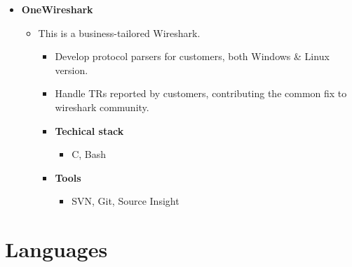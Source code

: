 \documentclass[11pt,a4paper,sans]{moderncv}        %
\begin{document}
{\begin{itemize}
\begin{itemize}
        \begin{itemize}
        \item Design and implement the whole application from scratch, cooperating with cross national customers and developers.
        \item \textbf{Techical stack}
            \begin{itemize}
            \item Java, Perl, Bash
            \end{itemize}
        \item \textbf{Tools}
            \begin{itemize}
            \item Git, Vim, Eclipse
            \end{itemize}
        \end{itemize}
    \end{itemize}
\item \textbf{OneWireshark}
    \begin{itemize}
    \item This is a business-tailored Wireshark.
        \begin{itemize}
            \item Develop protocol parsers for customers, both Windows \& Linux version.
            \item Handle TRs reported by customers, contributing the common fix to wireshark community.
            \item \textbf{Techical stack}
                \begin{itemize}
                \item C, Bash
                \end{itemize}
            \item \textbf{Tools}
                \begin{itemize}
                \item SVN, Git, Source Insight
                \end{itemize}
        \end{itemize}
    \end{itemize}
\end{itemize}}

\section{Languages}

\clearpage
\end{document}
